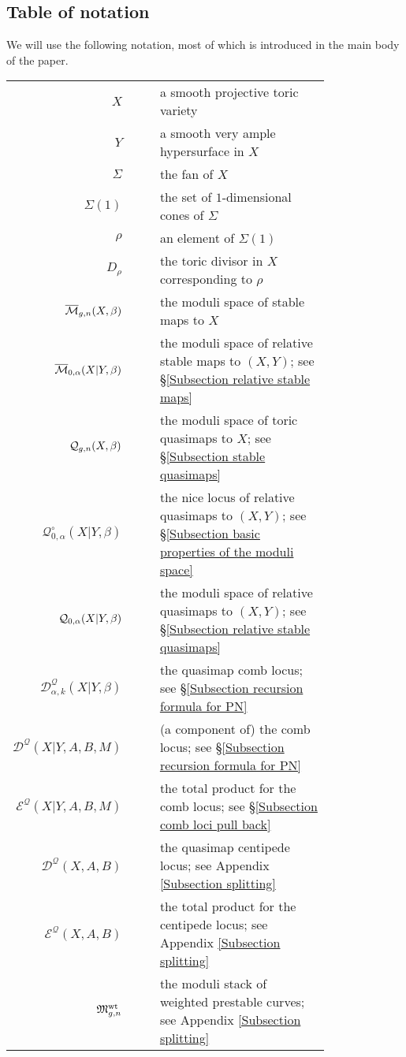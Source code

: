 \subsection{Table of notation} We will use the following notation, most of which is introduced in the main body of the paper.
\begin{longtabu}{r c c p{0.8\linewidth}}
$X$ & & & a smooth projective toric variety \\
$Y$ & & & a smooth very ample hypersurface in $X$ \\
$\Sigma$ & & & the fan of $X$ \\
$\Sigma(1)$ & & & the set of $1$-dimensional cones of $\Sigma$ \\
$\rho$ & & & an element of $\Sigma(1)$ \\
$D_\rho$ & & & the toric divisor in $X$ corresponding to $\rho$ \\
$\overline{\mathcal{M}}_{g,n}(X,\beta)$ & & & the moduli space of stable maps to $X$ \\
$\overline{\mathcal{M}}_{0,\alpha}(X|Y,\beta)$ & & & the moduli space of relative stable maps to $(X,Y)$; see \S \ref{Subsection relative stable maps} \\
$\mathcal{Q}_{g,n}(X,\beta)$ & & & the moduli space of toric quasimaps to $X$; see \S \ref{Subsection stable quasimaps} \\
$\mathcal{Q}^{\circ}_{0,\alpha}(X|Y,\beta)$ & & & the nice locus of relative quasimaps to $(X,Y)$; see \S \ref{Subsection basic properties of the moduli space} \\
$\mathcal{Q}_{0,\alpha}(X|Y,\beta)$ & & & the moduli space of relative quasimaps to $(X,Y)$; see \S \ref{Subsection relative stable quasimaps} \\
$\mathcal{D}^{\mathcal{Q}}_{\alpha,k}(X|Y,\beta)$ & & & the quasimap comb locus; see \S \ref{Subsection recursion formula for PN} \\
$\mathcal{D}^{\mathcal{Q}}(X|Y,A,B,M)$ & & & (a component of) the comb locus; see \S \ref{Subsection recursion formula for PN} \\
$\mathcal{E}^{\mathcal{Q}}(X|Y,A,B,M)$ & & & the total product for the comb locus; see \S \ref{Subsection comb loci pull back} \\
$\mathcal{D}^{\mathcal{Q}}(X,A,B)$ & & & the quasimap centipede locus; see Appendix \ref{Subsection splitting} \\
$\mathcal{E}^{\mathcal{Q}}(X,A,B)$ & & & the total product for the centipede locus; see Appendix \ref{Subsection splitting} \\
$\mathfrak M^{\operatorname{wt}}_{g,n}$ & & & the moduli stack of weighted prestable curves; see Appendix \ref{Subsection splitting} \\

\end{longtabu}

